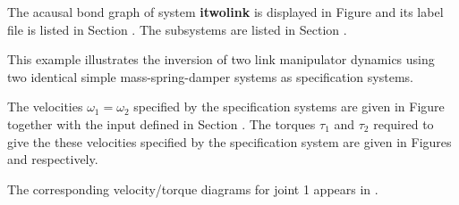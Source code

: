

   The acausal bond graph of system \textbf{itwolink} is
   displayed in Figure  and its label
   file is listed in Section .
   The subsystems are listed in Section .

This example illustrates the inversion of  two link manipulator
dynamics using two identical  simple mass-spring-damper systems as
specification systems.

The velocities $\omega_1=\omega_2$ specified by the specification
systems are given in Figure 
together with the input defined in Section .
The torques $\tau_1$ and $\tau_2$ required to give the these
velocities specified by the specification system are given in Figures
 and
 respectively.

The corresponding velocity/torque diagrams for  joint 1 appears in
. 

